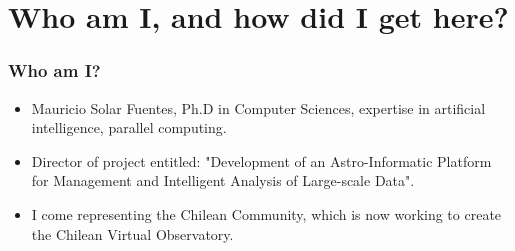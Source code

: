 \section{Who am I, and how did I get here?}

\begin{frame}
\frametitle{Who am I?}
\begin{itemize}
	\item Mauricio Solar Fuentes, Ph.D in Computer Sciences, expertise in artificial intelligence, parallel computing.
	\item Director of project entitled: "Development of an Astro-Informatic Platform for Management and 
		Intelligent Analysis of Large-scale Data".
	\item I come representing the Chilean Community, which is now working to create the Chilean Virtual Observatory.
\end{itemize}
\end{frame}
